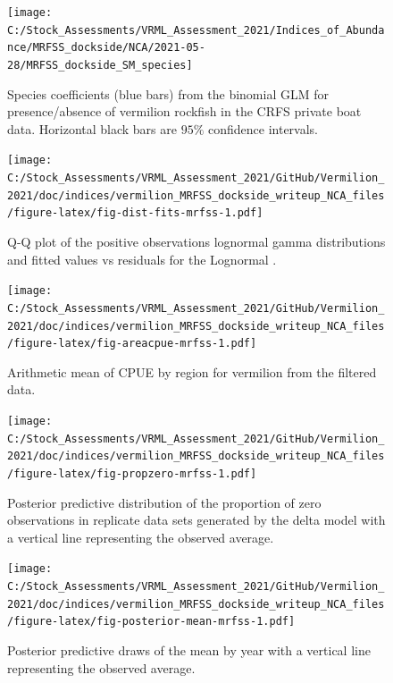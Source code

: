 \documentclass[11pt,
  english,
  a4paper,
]{article}
\begin{document}
\FloatBarrier

\FloatBarrier

\begin{figure}
\texttt{[image: C:/Stock\_Assessments/VRML\_Assessment\_2021/Indices\_of\_Abundance/MRFSS\_dockside/NCA/2021-05-28/MRFSS\_dockside\_SM\_species]} \caption{Species coefficients (blue bars) from the binomial GLM for presence/absence of vermilion rockfish in the CRFS private boat data. Horizontal black bars are $95\%$ confidence intervals.}\label{fig:fig-sm-mrfss}
\end{figure}

\begin{figure}
\centering
\texttt{[image: C:/Stock\_Assessments/VRML\_Assessment\_2021/GitHub/Vermilion\_2021/doc/indices/vermilion\_MRFSS\_dockside\_writeup\_NCA\_files/figure-latex/fig-dist-fits-mrfss-1.pdf]}
\caption{\label{fig:fig-dist-fits-mrfss}Q-Q plot of the positive observations lognormal gamma distributions and fitted values vs residuals for the Lognormal .}
\end{figure}

\FloatBarrier

\begin{figure}
\centering
\texttt{[image: C:/Stock\_Assessments/VRML\_Assessment\_2021/GitHub/Vermilion\_2021/doc/indices/vermilion\_MRFSS\_dockside\_writeup\_NCA\_files/figure-latex/fig-areacpue-mrfss-1.pdf]}
\caption{\label{fig:fig-areacpue-mrfss}Arithmetic mean of CPUE by region for vermilion from the filtered data.}
\end{figure}

\begin{figure}
\centering
\texttt{[image: C:/Stock\_Assessments/VRML\_Assessment\_2021/GitHub/Vermilion\_2021/doc/indices/vermilion\_MRFSS\_dockside\_writeup\_NCA\_files/figure-latex/fig-propzero-mrfss-1.pdf]}
\caption{\label{fig:fig-propzero-mrfss}Posterior predictive distribution of the proportion of zero observations in replicate data sets generated by the delta model with a vertical line representing the observed average.}
\end{figure}

\begin{figure}
\centering
\texttt{[image: C:/Stock\_Assessments/VRML\_Assessment\_2021/GitHub/Vermilion\_2021/doc/indices/vermilion\_MRFSS\_dockside\_writeup\_NCA\_files/figure-latex/fig-posterior-mean-mrfss-1.pdf]}
\caption{\label{fig:fig-posterior-mean-mrfss}Posterior predictive draws of the mean by year with a vertical line representing the observed average.}
\end{figure}
\end{document}
